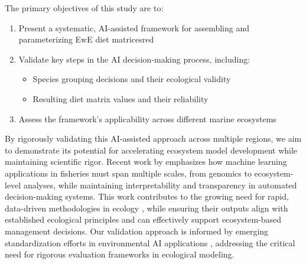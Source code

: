 The primary objectives of this study are to:

\begin{enumerate}
    \item Present a systematic, AI-assisted framework for assembling and parameterizing EwE diet matricesred
    \item Validate key steps in the AI decision-making process, including:
        \begin{itemize}
            \item Species grouping decisions and their ecological validity
            \item Resulting diet matrix values and their reliability
        \end{itemize}
    \item Assess the framework's applicability across different marine ecosystems
\end{enumerate}

By rigorously validating this AI-assisted approach across multiple regions, we aim to demonstrate its potential for accelerating ecosystem model development while maintaining scientific rigor. Recent work by \citet{Kuhn2024} emphasizes how machine learning applications in fisheries must span multiple scales, from genomics to ecosystem-level analyses, while maintaining interpretability and transparency in automated decision-making systems. This work contributes to the growing need for rapid, data-driven methodologies in ecology \citep{Kelling2009, Michener2012}, while ensuring their outputs align with established ecological principles and can effectively support ecosystem-based management decisions. Our validation approach is informed by emerging standardization efforts in environmental AI applications \citep{Guo2025}, addressing the critical need for rigorous evaluation frameworks in ecological modeling.
